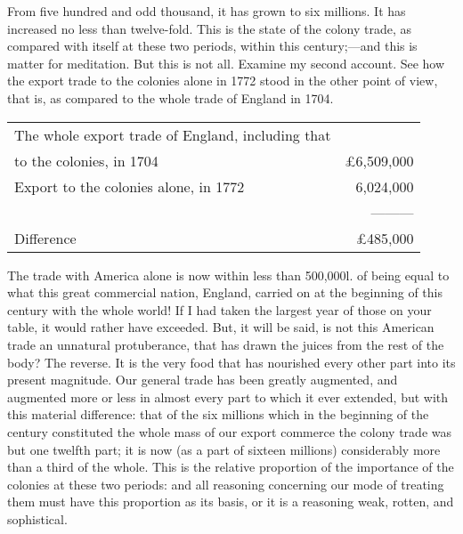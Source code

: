 From five hundred and odd thousand, it has grown to six millions. It has increased no less than twelve-fold. This is the state of the colony trade, as compared with itself at these two periods, within this century;—and this is matter for meditation. But this is not all. Examine my second account. See how the export trade to the colonies alone in 1772 stood in the other point of view, that is, as compared to the whole trade of England in 1704.

\begin{center}
\begin{tabular}{l r}
The whole export trade of England, including that & \\
to the colonies, in 1704 & £6,509,000 \\
Export to the colonies alone, in 1772 & 6,024,000 \\
	       & ———  \\
Difference & £485,000
\end{tabular}
\end{center}

The trade with America alone is now within less than 500,000l. of being equal to what this great commercial nation, England, carried on at the beginning of this century with the whole world! If I had taken the largest year of those on your table, it would rather have exceeded. But, it will be said, is not this American trade an unnatural protuberance, that has drawn the juices from the rest of the body? The reverse. It is the very food that has nourished every other part into its present magnitude. Our general trade has been greatly augmented, and augmented more or less in almost every part to which it ever extended, but with this material difference: that of the six millions which in the beginning of the century constituted the whole mass of our export commerce the colony trade was but one twelfth part; it is now (as a part of sixteen millions) considerably more than a third of the whole. This is the relative proportion of the importance of the colonies at these two periods: and all reasoning concerning our mode of treating them must have this proportion as its basis, or it is a reasoning weak, rotten, and sophistical.

